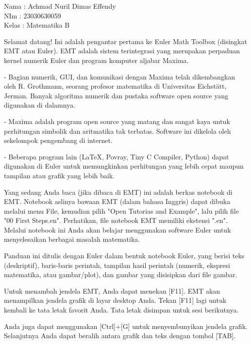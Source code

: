 \documentclass[a4paper,10pt]{article}
\begin{document}
\begin{eulernotebook}
\begin{eulercomment}
Nama  : Achmad Nuril Dimas Effendy\\
NIm   : 23030630059\\
Kelas : Matematika B

\begin{eulercomment}
\begin{eulercomment}
Selamat datang! Ini adalah pengantar pertama ke Euler Math Toolbox
(disingkat EMT atau Euler). EMT adalah sistem terintegrasi yang
merupakan perpaduan kernel numerik Euler dan program komputer aljabar
Maxima.

- Bagian numerik, GUI, dan komunikasi dengan Maxima telah dikembangkan
oleh R. Grothmann, seorang profesor matematika di Universitas
Eichstätt, Jerman. Banyak algoritma numerik dan pustaka software open
source yang digunakan di dalamnya.

- Maxima adalah program open source yang matang dan sangat kaya untuk
perhitungan simbolik dan aritmatika tak terbatas. Software ini
dikelola oleh sekelompok pengembang di internet.

- Beberapa program lain (LaTeX, Povray, Tiny C Compiler, Python) dapat
digunakan di Euler untuk memungkinkan perhitungan yang lebih cepat
maupun tampilan atau grafik yang lebih baik.

Yang sedang Anda baca (jika dibaca di EMT) ini adalah berkas notebook
di EMT. Notebook aslinya bawaan EMT (dalam bahasa Inggris) dapat
dibuka melalui menu File, kemudian pilih "Open Tutorias and Example",
lalu pilih file "00 First Steps.en". Perhatikan, file notebook EMT
memiliki ekstensi ".en". Melalui notebook ini Anda akan belajar
menggunakan software Euler untuk menyelesaikan berbagai masalah
matematika.
\end{eulercomment}
\begin{eulercomment}
Panduan ini ditulis dengan Euler dalam bentuk notebook Euler, yang
berisi teks (deskriptif), baris-baris perintah, tampilan hasil
perintah (numerik, ekspresi matematika, atau gambar/plot), dan gambar
yang disisipkan dari file gambar.

Untuk menambah jendela EMT, Anda dapat menekan [F11]. EMT akan
menampilkan jendela grafik di layar desktop Anda. Tekan [F11] lagi
untuk kembali ke tata letak favorit Anda. Tata letak disimpan untuk
sesi berikutnya.

Anda juga dapat menggunakan [Ctrl]+[G] untuk menyembunyikan jendela
grafik. Selanjutnya Anda dapat beralih antara grafik dan teks dengan
tombol [TAB].


\end{eulercomment}
\end{eulercomment}
\end{eulercomment}
\end{eulernotebook}
\end{document}
